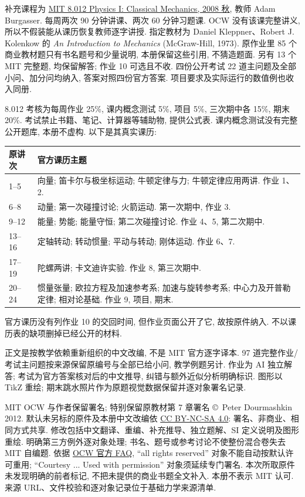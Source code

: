 补充课程为 \href{https://ocw.mit.edu/courses/8-012-physics-i-classical-mechanics-fall-2008/}{MIT 8.012 Physics I: Classical Mechanics, 2008 秋}, 教师 Adam Burgasser. 每周两次 90 分钟讲课、两次 60 分钟习题课. OCW 没有该课完整讲义, 所以不假装能从课历恢复教师逐字讲授. 指定教材为 Daniel Kleppner、Robert J. Kolenkow 的 \emph{An Introduction to Mechanics} (McGraw-Hill, 1973). 原作业里 85 个商业教材题只有书名题号和少量说明, 本册保留这些引用, 不猜造题面. 另有 13 个 MIT 完整题, 均保留解答; 作业 10 可选且不收. 四份公开考试 22 道主问题及全部小问、加分问均纳入, 答案对照四份官方答案. 项目要求及实际运行的数值例也收入同册.

8.012 考核为每周作业 25\%, 课内概念测试 5\%, 项目 5\%, 三次期中各 15\%, 期末 20\%. 考试禁止书籍、笔记、计算器等辅助物, 提供公式表. 课内概念测试没有完整公开题库, 本册不虚构. 以下是其真实课历:
\begin{longtable}{@{}p{}p{}@{}}
\toprule 原讲次 & 官方课历主题 \\\midrule
1--5 & 向量; 笛卡尔与极坐标运动; 牛顿定律与力; 牛顿定律应用两讲. 作业 1、2. \\
6--8 & 动量; 第一次碰撞讨论; 火箭运动. 第一次期中, 作业 3. \\
9--12 & 能量; 势能; 能量守恒; 第二次碰撞讨论. 作业 4、5, 第二次期中. \\
13--16 & 定轴转动; 转动惯量; 平动与转动; 刚体运动. 作业 6、7. \\
17--19 & 陀螺两讲; 卡文迪许实验. 作业 8, 第三次期中. \\
20--24 & 惯量张量; 欧拉方程及加速参考系; 加速与旋转参考系; 中心力及开普勒定律; 相对论基础. 作业 9, 项目, 期末. \\\bottomrule
\end{longtable}
官方课历没有列作业 10 的交回时间, 但作业页面公开了它, 故按原件纳入. 不以课历表的缺项删掉已经公开的材料.


正文是按教学依赖重新组织的中文改编, 不是 MIT 官方逐字译本. 97 道完整作业/考试主问题按来源保留原编号与全部已给小问, 教学例题另计. 作业为 AI 独立解答; 考试为官方答案核对后的中文推导, 纠错与额外近似分析明确标识. 图形以 TikZ 重绘; 期末跳水照片作为原题视觉数据保留并逐对象署名记录.

MIT OCW 与作者保留署名; 特别保留原教材第 7 章署名 \copyright\ Peter Dourmashkin 2012. 默认未另标的原件及本册中文改编依 \href{https://creativecommons.org/licenses/by-nc-sa/4.0/}{CC BY-NC-SA 4.0}: 署名、非商业、相同方式共享. 修改包括中文翻译、重编、补充推导、独立题解、SI 定义说明及图形重绘. 明确第三方例外逐对象处理; 书名、题号或参考讨论不使整份混合卷失去 MIT 自编题. 依据 \href{https://mitocw.zendesk.com/hc/en-us/articles/4414756181403-How-is-all-rights-reserved-content-different-from-the-rest-of-OCW-content}{OCW 官方 FAQ}, “all rights reserved” 对象不能自动按默认许可重用; “Courtesy ... Used with permission” 对象须延续专门署名. 本次所取原件未发现明确的前者标记, 不把未提供的商业书题全文补入. 本册不表示 MIT 认可. 来源 URL、文件校验和逐对象记录位于基础力学来源清单.
